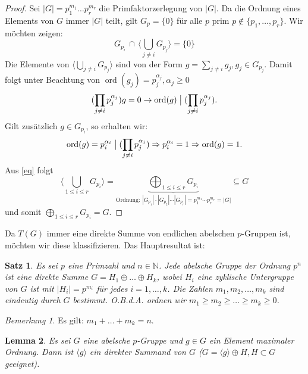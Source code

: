 \documentclass[12pt]{scrartcl} %
\DeclareMathOperator{\ord}{ord}
\newcommand{\divides}{\mathrel{\bigm|}}
\newtheorem{thm}{Satz}[section]
\newtheorem{lemma}[thm]{Lemma}
\theoremstyle{definition}
\theoremstyle{remark}
\newtheorem*{nb}{Bemerkung}
\begin{document}
\begin{proof}
Sei $| G| =p_{1}^{m_{1}}\dots p_{r}^{m_{r}}$ die Primfaktorzerlegung von $| G|$. 
Da die Ordnung eines Elements von $G$ immer $| G|$ teilt, gilt $G_p=\{ 0\}$ für alle $p$ prim $p\notin \{ p_{1},\dots,p_{r}\}$. Wir möchten zeigen:
\begin{equation} \label{eq}
G_{p_{i}} \,\cap\, \langle\bigcup_{j\neq i} G_{p_{j}} \rangle = \{ 0 \}
\end{equation}
Die Elemente von $\langle\bigcup_{j\neq i} G_{p_{j}}\rangle$ sind von der Form $g=\sum_{j\neq i} g_{j}, g_{j} \in G_{p_{j}}$. Damit folgt unter Beachtung von $\ord(g_{j})=p_{j}^{\alpha_{j}}, \alpha_{j}\geq 0$ 
\[(\prod_{j\neq i} p_{j}^{\alpha_{j}})g=0 \rightarrow \ord(g) \divides (\prod_{j\neq i} p_{j}^{\alpha_{j}}).\]
Gilt zusätzlich $g \in G_{p_{i}}$, so erhalten wir:
\[ \ord(g)=p_{i}^{\alpha_{i}} \divides (\prod_{j\neq i} p_{j}^{\alpha_{j}})\Rightarrow p_{i}^{\alpha_{i}}=1 \Rightarrow \ord(g)=1.\]
Aus \eqref{eq} folgt 
$$\langle\bigcup_{1\leq i\leq r} G_{p_{i}}\rangle = \underbrace{\bigoplus_{1 \leq i \leq r} G_{p_i}}_{\text{Ordnung: } |G_{p_1}|\cdot|G_{p_2}|\cdots|G_{p_r}| = p_1^{m_1}\cdots p_r^{m_r} = |G|} \subseteq G$$
und somit $\bigoplus_{1 \leq i \leq r} G_{p_i} = G$.
\end{proof}

Da $T(G)$ immer eine direkte Summe von endlichen abelschen $p$-Gruppen ist, möchten wir diese klassifizieren. Das Hauptresultat ist:

\begin{thm}
Es sei $p$ eine Primzahl und $n\in \mathbb{N}$. 
Jede abelsche Gruppe der Ordnung $p^n$ ist eine direkte Summe $G=H_{1}\oplus \dots\oplus H_{k}$, wobei $H_{i}$ eine zyklische Untergruppe von $G$ ist mit $|H_{i}|=p^{m_{i}}$ für jedes $i=1,\dots,k$.
Die Zahlen $m_1,m_2,\dots,m_k$ sind eindeutig durch $G$ bestimmt. O.B.d.A. ordnen wir $m_{1}\geq m_{2}\geq \dots\geq m_{k}\geq 0$.
\end{thm}

\begin{nb}
Es gilt: $m_{1}+\dots+m_{k}=n$.
\end{nb}

\begin{lemma}
Es sei $G$ eine abelsche $p$-Gruppe und $g\in G$ ein Element maximaler Ordnung. 
Dann ist $\langle g\rangle$ ein direkter Summand von $G$ ($G=\langle g\rangle\oplus H, H\subset G$ geeignet).
\end{lemma}
\end{document}

